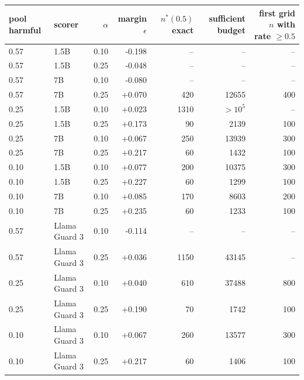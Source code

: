 \begin{tabular}{llrrrrr}
\toprule
pool harmful & scorer & $\alpha$ & margin $\epsilon$ & $n^{*}(0.5)$ exact & sufficient budget & first grid $n$ with rate $\ge 0.5$ \\
\midrule
0.57 & 1.5B & 0.10 & -0.198 & -- & -- & -- \\
0.57 & 1.5B & 0.25 & -0.048 & -- & -- & -- \\
0.57 & 7B & 0.10 & -0.080 & -- & -- & -- \\
0.57 & 7B & 0.25 & +0.070 & 420 & 12655 & 400 \\
0.25 & 1.5B & 0.10 & +0.023 & 1310 & $>10^5$ & -- \\
0.25 & 1.5B & 0.25 & +0.173 & 90 & 2139 & 100 \\
0.25 & 7B & 0.10 & +0.067 & 250 & 13939 & 300 \\
0.25 & 7B & 0.25 & +0.217 & 60 & 1432 & 100 \\
0.10 & 1.5B & 0.10 & +0.077 & 200 & 10375 & 300 \\
0.10 & 1.5B & 0.25 & +0.227 & 60 & 1299 & 100 \\
0.10 & 7B & 0.10 & +0.085 & 170 & 8603 & 200 \\
0.10 & 7B & 0.25 & +0.235 & 60 & 1233 & 100 \\
0.57 & Llama Guard 3 & 0.10 & -0.114 & -- & -- & -- \\
0.57 & Llama Guard 3 & 0.25 & +0.036 & 1150 & 43145 & -- \\
0.25 & Llama Guard 3 & 0.10 & +0.040 & 610 & 37488 & 800 \\
0.25 & Llama Guard 3 & 0.25 & +0.190 & 70 & 1742 & 100 \\
0.10 & Llama Guard 3 & 0.10 & +0.067 & 260 & 13577 & 300 \\
0.10 & Llama Guard 3 & 0.25 & +0.217 & 60 & 1406 & 100 \\
\bottomrule
\end{tabular}

